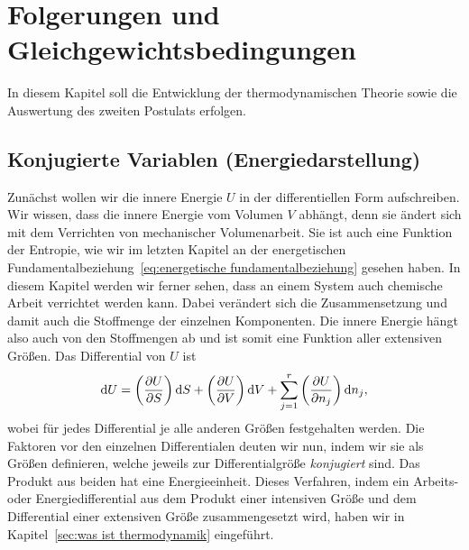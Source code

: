 
\chapter{Folgerungen und Gleichgewichtsbedingungen}

In diesem Kapitel soll die Entwicklung der thermodynamischen Theorie sowie die Auswertung des zweiten Postulats erfolgen.

\section{Konjugierte Variablen (Energiedarstellung)}

Zunächst wollen wir die innere Energie $U$ in der differentiellen Form aufschreiben. Wir wissen, dass die innere Energie vom Volumen $V$ abhängt, denn sie ändert sich mit dem Verrichten von mechanischer Volumenarbeit. Sie ist auch eine Funktion der Entropie, wie wir im letzten Kapitel an der energetischen Fundamentalbeziehung~\eqref{eq:energetische fundamentalbeziehung} gesehen haben. In diesem Kapitel werden wir ferner sehen, dass an einem System auch chemische Arbeit verrichtet werden kann. Dabei verändert sich die Zusammensetzung und damit auch die Stoffmenge der einzelnen Komponenten. Die innere Energie hängt also auch von den Stoffmengen ab und ist somit eine Funktion aller extensiven Größen. Das Differential von $U$ ist
\begin{align*}
    \mathop{}\!\mathrm{d} U = \left(\frac{\partial U}{\partial S}\right) \mathop{}\!\mathrm{d} S + \left(\frac{\partial U}{\partial V}\right) \mathop{}\!\mathrm{d} V + \sum_{j = 1}^r \left(\frac{\partial U}{\partial n_j}\right) \mathop{}\!\mathrm{d} n_j,
\end{align*}
wobei für jedes Differential je alle anderen Größen festgehalten werden.
Die Faktoren vor den einzelnen Differentialen deuten wir nun, indem wir sie als Größen definieren, welche jeweils zur Differentialgröße \textit{konjugiert} sind.
Das Produkt aus beiden hat eine Energieeinheit.
Dieses Verfahren, indem ein Arbeits- oder Energiedifferential aus dem Produkt einer intensiven Größe und dem Differential einer extensiven Größe zusammengesetzt wird, haben wir in Kapitel~\ref{sec:was ist thermodynamik} eingeführt.
